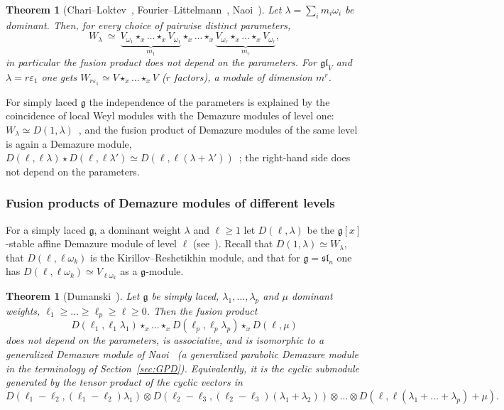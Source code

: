 \documentclass[11pt]{amsart}
\numberwithin{equation}{section}
\newtheorem{theorem}[equation]{Theorem}
\theoremstyle{definition}
\newcommand{\gl}{\mathfrak{gl}}
\newcommand{\fg}{\mathfrak{g}}
\newcommand{\eps}{\varepsilon}
\begin{document}
	\begin{theorem}[Chari--Loktev~\cite{CL}, Fourier--Littelmann~\cite{FL1,FL2}, Naoi~\cite{N}]\label{thm:Weyl-fusion}
		Let $\lambda=\sum_i m_i\omega_i$ be dominant. Then, for every choice of pairwise distinct parameters,
		\[
		W_\lambda\ \simeq\ \underbrace{V_{\omega_1}\star_x\dots\star_xV_{\omega_1}}_{m_1}\star_x\dots\star_x\underbrace{V_{\omega_r}\star_x\dots\star_xV_{\omega_r}}_{m_r},
		\]
		in particular the fusion product does not depend on the parameters. For $\gl_V$ and $\lambda=r\eps_1$ one gets $W_{r\eps_1}\simeq V\star_x\dots\star_xV$ ($r$ factors), a module of dimension $m^r$.
	\end{theorem}
	
	For simply laced $\fg$ the independence of the parameters is explained by the coincidence of local Weyl modules with the Demazure modules of level one: $W_\lambda\simeq D(1,\lambda)$~\cite{FL2}, and the fusion product of Demazure modules of the same level is again a Demazure module, $D(\ell,\ell\lambda)\star D(\ell,\ell\lambda')\simeq D(\ell,\ell(\lambda+\lambda'))$~\cite{FL1}; the right-hand side does not depend on the parameters.
	
	\subsubsection{Fusion products of Demazure modules of different levels}\label{sssec:dumanski}
	For a simply laced $\fg$, a dominant weight $\lambda$ and $\ell\ge1$ let $D(\ell,\lambda)$ be the $\fg[x]$-stable affine Demazure module of level $\ell$ (see~\cite[\S1.3]{D}). Recall that $D(1,\lambda)\simeq W_\lambda$, that $D(\ell,\ell\omega_k)$ is the Kirillov--Reshetikhin module, and that for $\fg=\mathfrak{sl}_n$ one has $D(\ell,\ell\omega_k)\simeq V_{\ell\omega_k}$ as a $\fg$-module.
	
	\begin{theorem}[Dumanski~{\cite[Cor.~2.3]{D}}]\label{thm:Dumanski}
		Let $\fg$ be simply laced, $\lambda_1,\dots,\lambda_p$ and $\mu$ dominant weights, $\ell_1\ge\dots\ge\ell_p\ge\ell\ge0$. Then the fusion product
		\[
		D(\ell_1,\ell_1\lambda_1)\star_x\dots\star_xD(\ell_p,\ell_p\lambda_p)\star_xD(\ell,\mu)
		\]
		does not depend on the parameters, is associative, and is isomorphic to a generalized Demazure module of Naoi~\cite{Naoi} (a generalized parabolic Demazure module in the terminology of Section~\ref{sec:GPD}). Equivalently, it is the cyclic submodule generated by the tensor product of the cyclic vectors in
		\[
		D(\ell_1-\ell_2,(\ell_1-\ell_2)\lambda_1)\otimes D(\ell_2-\ell_3,(\ell_2-\ell_3)(\lambda_1+\lambda_2))\otimes\dots\otimes D(\ell,\ell(\lambda_1+\dots+\lambda_p)+\mu).
		\]
	\end{theorem}
	
\end{document}
